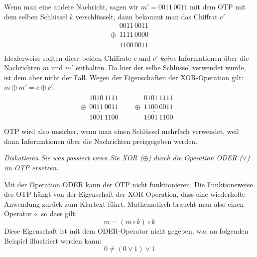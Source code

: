 \documentclass[
  ngerman,
  DIV=12
]{scrartcl}
\begin{document}
\medskip\noindent
Wenn man eine andere Nachricht, sagen wir $m' = 0011\,0011$ mit dem OTP mit dem selben Schlüssel $k$ verschlüsselt, dann bekommt man das Chiffrat $c'$. 
\begin{equation*}
\begin{array}{c}
\phantom{\oplus9}0011\,0011\\
\underline{\oplus\phantom{9}1111\,0000}\\
\phantom{\oplus9}1100\,0011\\
\end{array}
\end{equation*}
Idealerweise sollten diese beiden Chiffrate $c$ und $c'$ \emph{keine} Informationen über die Nachrichten $m$ und $m'$ enthalten. Da hier der selbe Schlüssel verwendet wurde, ist dem aber nicht der Fall. Wegen der Eigenschaften der XOR-Operation gilt: $m \oplus m' = c \oplus c'$. 
\begin{align*}
\begin{array}{c}
\phantom{\oplus9}1010\,1111\\
\underline{\oplus\phantom{9}0011\,0011}\\
\phantom{\oplus9}1001\,1100\\
\end{array}&&
\begin{array}{c}
\phantom{\oplus9}0101\,1111\\
\underline{\oplus\phantom{9}1100\,0011}\\
\phantom{\oplus9}1001\,1100\\
\end{array}&
\end{align*}
OTP wird also unsicher, wenn man einen Schlüssel mehrfach verwendet, weil dann Informationen über die Nachrichten preisgegeben werden.

\bigskip\noindent
\emph{Diskutieren Sie was passiert wenn Sie XOR ($\oplus$) durch die Operation ODER ($\vee$) im OTP ersetzen.}

\medskip\noindent
Mit der Operation ODER kann der OTP nicht funktionieren. Die Funktionsweise des OTP hängt von der Eigenschaft der XOR-Operation, dass eine wiederholte Anwendung zurück zum Klartext führt. Mathematisch braucht man also einen Operator $\circ$, so dass gilt:
\begin{equation*}
m = (m \circ k) \circ k  
\end{equation*}
Diese Eigenschaft ist mit dem ODER-Operator nicht gegeben, was an folgenden Beispiel illustriert werden kann:
\begin{equation*}
0 \neq (0 \vee 1) \vee 1
\end{equation*}
\end{document}
